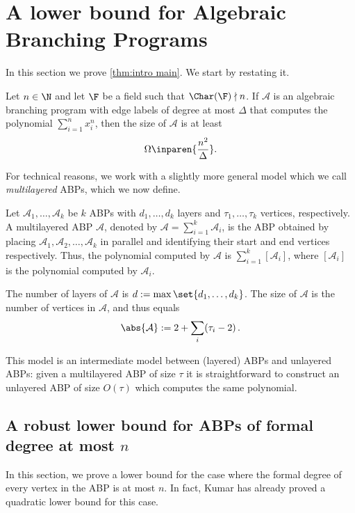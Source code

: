 \section{A lower bound for Algebraic Branching Programs}	\label{sec:layered}
In this section we prove \autoref{thm:intro main}. We start by restating it.

\begin{theorem}\label{thm:main}
	Let $n \in \N$ and let $\F$ be a field such that $\Char(\F) \nmid n$.
	If $\mathcal{A}$ is an algebraic branching program with edge labels of degree at most $\Delta$ that computes the polynomial $\sum_{i=1}^{n} x_i^n$, then the size of $\mathcal{A}$ is at least
	\[
		\Omega \inparen{\frac{n^2}{\Delta}}.
	\]
\end{theorem}
	
For technical reasons, we work with a slightly more general model which we call \emph{multilayered} ABPs, which we now define. 
	
\begin{definition}
	Let $\mathcal{A}_1, \ldots, \mathcal{A}_k$ be $k$ ABPs with $d_1, \ldots, d_k$ layers and $\tau_1, \ldots, \tau_k$ vertices, respectively. A multilayered ABP $\mathcal{A}$, denoted by $\mathcal{A} = \sum_{i = 1}^k \mathcal{A}_i$, is the ABP obtained by placing $\mathcal{A}_1, \mathcal{A}_2, \ldots, \mathcal{A}_k$ in parallel and identifying their start and end vertices respectively. Thus, the polynomial computed by $\mathcal{A}$ is $\sum_{i=1}^k [\mathcal{A}_i]$, where $ [\mathcal{A}_i]$ is the polynomial computed by $\mathcal{A}_i$. 
	
The number of layers of $\mathcal{A}$ is $d := \max \set{d_1, \ldots, d_k}$. The size of $\mathcal{A}$ is the number of vertices in $\mathcal{A}$, and thus equals  \[\abs{ \mathcal{A}} := 2 + \sum_i (\tau_i-2) \, .\] 
\end{definition}

This model is an intermediate model between (layered) ABPs and unlayered ABPs: given a multilayered ABP of size $\tau$ it is straightforward to construct an unlayered ABP of size $O(\tau)$ which computes the same polynomial. 	

	
\subsection{A robust lower bound for ABPs of formal degree at most $n$}
In this section, we prove a lower bound for the case where the formal degree of every vertex in the ABP is at most $n$. 
In fact, Kumar \cite{K19} has already proved a quadratic lower bound for this case.
	
